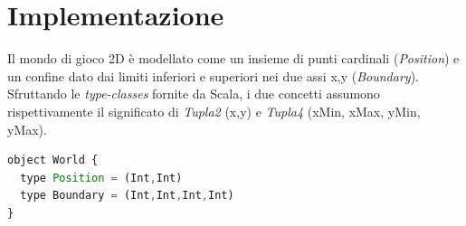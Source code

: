 \documentclass[../main.tex]{subfiles}
\begin{document}
\section{Implementazione}
Il mondo di gioco 2D è modellato come un insieme di punti cardinali (\textit{Position}) e un confine dato dai limiti inferiori e superiori nei due assi x,y (\textit{Boundary}). Sfruttando le \textit{type-classes} fornite da Scala, i due concetti assumono rispettivamente il significato di \textit{Tupla2} (x,y) e \textit{Tupla4} (xMin, xMax, yMin, yMax).
\begin{lstlisting}[language=Javascript, caption=Definizione dei concetti rappresentanti il mondo 2D di gioco tramite \textit{type-classes}.]
object World {
  type Position = (Int,Int)
  type Boundary = (Int,Int,Int,Int)
}
\end{lstlisting}
\end{document}
